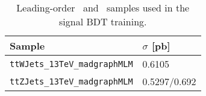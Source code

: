 \begin{table}
  \centering
  \begin{tabular}{ll}
    Sample & $\sigma$ [pb] \\\hline
    \verb|ttWJets_13TeV_madgraphMLM| & 0.6105 \\
    \verb|ttZJets_13TeV_madgraphMLM| & 0.5297/0.692 \\\hline
  \end{tabular}
  \caption[Leading-order \ttW\ and \ttZ\ samples used in the signal BDT training.]{Leading-order \ttW\ and \ttZ\ samples used in the signal BDT training.} \label{tab:ttvlo_samples}
\end{table}



